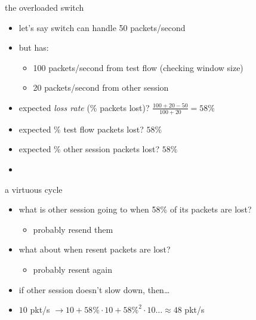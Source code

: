 \begin{frame}{the overloaded switch}
\begin{itemize}
\item let's say switch can handle 50 packets/second
\item but has:
    \begin{itemize}
    \item 100 packets/second from test flow (checking window size) 
    \item 20 packets/second from other session
    \end{itemize}
\item expected \textit{loss rate} (\% packets lost)? $\frac{100+20-50}{100+20}=58\%$
\item expected \% test flow packets lost? $58\%$
\item expected \% other session packets lost? $58\%$
\item<2-> 
\end{itemize}
\end{frame}

\begin{frame}{a virtuous cycle}
\begin{itemize}
\item what is other session going to when 58\% of its packets are lost?
    \begin{itemize}
    \item probably resend them
    \end{itemize}
\item what about when resent packets are lost?
    \begin{itemize}
    \item probably resent again
    \end{itemize}
\vspace{.5cm}
\item if other session doesn't slow down, then\ldots
\item $10$ pkt/s $\rightarrow10+58\%\cdot10+58\%^2\cdot10 \ldots\approx 48$ pkt/s
\end{itemize}
\end{frame}


